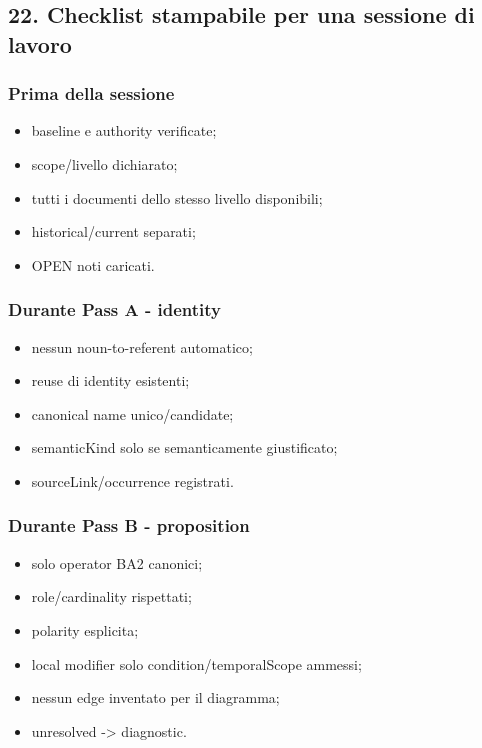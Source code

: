\documentclass[
  9pt,
  a4paper,
]{article}
\providecommand{\tightlist}{%
  \setlength{\itemsep}{0pt}\setlength{\parskip}{0pt}}
\begin{document}
\subsection{22. Checklist stampabile per una sessione di
lavoro}\label{checklist-stampabile-per-una-sessione-di-lavoro}

\subsubsection{Prima della sessione}\label{prima-della-sessione}

\begin{itemize}
\tightlist
\item[$\square$]
  baseline e authority verificate;
\item[$\square$]
  scope/livello dichiarato;
\item[$\square$]
  tutti i documenti dello stesso livello disponibili;
\item[$\square$]
  historical/current separati;
\item[$\square$]
  OPEN noti caricati.
\end{itemize}

\subsubsection{Durante Pass A -
identity}\label{durante-pass-a---identity}

\begin{itemize}
\tightlist
\item[$\square$]
  nessun noun-to-referent automatico;
\item[$\square$]
  reuse di identity esistenti;
\item[$\square$]
  canonical name unico/candidate;
\item[$\square$]
  semanticKind solo se semanticamente giustificato;
\item[$\square$]
  sourceLink/occurrence registrati.
\end{itemize}

\subsubsection{Durante Pass B -
proposition}\label{durante-pass-b---proposition}

\begin{itemize}
\tightlist
\item[$\square$]
  solo operator BA2 canonici;
\item[$\square$]
  role/cardinality rispettati;
\item[$\square$]
  polarity esplicita;
\item[$\square$]
  local modifier solo condition/temporalScope ammessi;
\item[$\square$]
  nessun edge inventato per il diagramma;
\item[$\square$]
  unresolved -\textgreater{} diagnostic.
\end{itemize}
\end{document}
